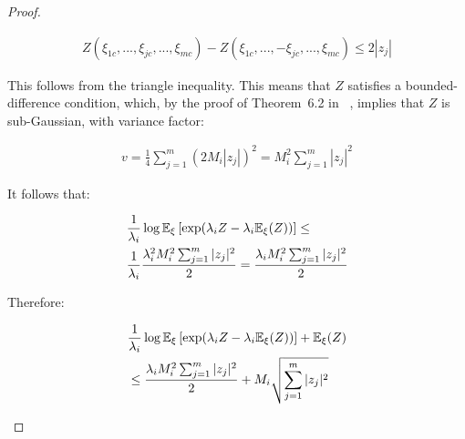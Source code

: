 \begin{proof}
\begin{small}
\begin{equation*}
\begin{aligned}
Z(\xi_{1c},..., \xi_{jc},...,\xi_{mc}) - Z(\xi_{1c},..., -\xi_{jc},...,\xi_{mc}) \leq 2|z_j|
\end{aligned}
\end{equation*}
\end{small}
This follows from the triangle inequality.
This means that $Z$ satisfies a bounded-difference condition, which, by the proof of Theorem~6.2 in ~\citep{Boucheron2010}, implies that $Z$ is sub-Gaussian, with variance factor:
\begin{small}
\begin{equation*}
\begin{aligned}
v = \frac{1}{4} \sum_{j=1}^m (2M_i|z_j|)^2 = M_i^2 \sum_{j=1}^m |z_j|^2
\end{aligned}
\end{equation*}
\end{small}
It follows that:
\begin{small}
\begin{equation*}
\begin{aligned}
&\frac{1}{\lambda_i} \log \mathbb{E}_{\xi}\left[\exp( \lambda_i Z - \lambda_i \mathbb{E}_{\xi}(Z)) \right] \leq \\& \frac{1}{\lambda_i} \frac{\lambda_i^2 M_i^2 \sum_{j=1}^m |z_j|^2}{2} =  \frac{\lambda_i M_i^2 \sum_{j=1}^m |z_j|^2}{2}  
\end{aligned}
\end{equation*}
\end{small}
Therefore:
\begin{small}
\begin{equation}\label{eq:eq2}
\begin{aligned}
&\frac{1}{\lambda_i} \log \mathbb{E}_{\xi}\left[ \exp( \lambda_i Z - \lambda_i \mathbb{E}_{\xi}(Z)) \right] +  \mathbb{E}_{\xi} (Z) \\
&\leq \frac{\lambda_i M_i^2 \sum_{j=1}^m |z_j|^2}{2} + M_i\sqrt{\sum_{j=1}^m |z_j|^2} 
\end{aligned}
\end{equation}
\end{small}

\end{proof}
